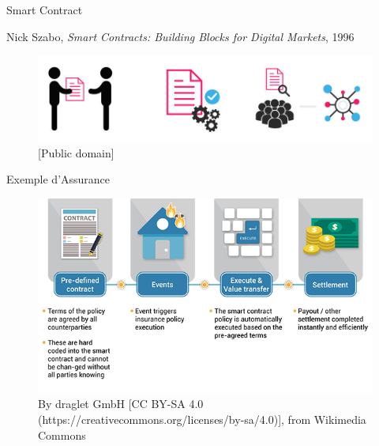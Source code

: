 \documentclass[xcolor=dvipsnames]{beamer}
\begin{document}
\begin{frame}{Smart Contract}
	
	
	\begin{center}
		Nick Szabo, \textit{Smart Contracts: Building Blocks for Digital Markets}, 1996
	\end{center}		
	
	\begin{figure}
		\centering
		\includegraphics[scale=.25]{smart_contract}
		\caption{[Public domain]}
	\end{figure}
	
	
\end{frame}

\begin{frame}{Exemple d'Assurance}

	\begin{figure}
		\centering
		\includegraphics[scale=.5]{insurance_contract}
		\caption{By draglet GmbH [CC BY-SA 4.0 (https://creativecommons.org/licenses/by-sa/4.0)], from Wikimedia Commons}
	\end{figure}

\end{frame}
\end{document}
